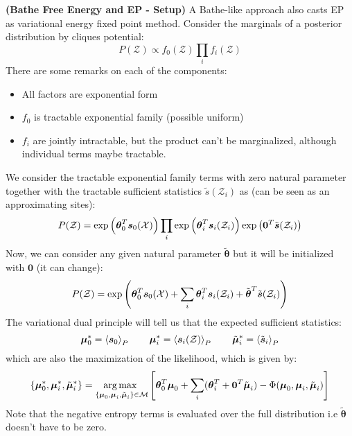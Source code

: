 \begin{remark}{\textbf{(Bathe Free Energy and EP - Setup)}}
    A Bathe-like approach also casts EP as variational energy fixed point method. Consider the marginals of a posterior distribution by cliques potential:
    \begin{equation*}
        P(\mathcal{Z}) \propto f_0(\mathcal{Z})\prod_i f_i(\mathcal{Z})
    \end{equation*}
    There are some remarks on each of the components:
    \begin{itemize}
        \item All factors are exponential form
        \item $f_0$ is tractable exponential family (possible uniform)
        \item $f_i$ are jointly intractable, but the product can't be marginalized, although individual terms maybe tractable. 
    \end{itemize}
    We consider the tractable exponential family terms with zero natural parameter together with the tractable sufficient statistics $\tilde{s}(\mathcal{Z}_i)$ as (can be seen as an approximating sites):
    \begin{equation*}
        P(\mathcal{Z}) = \exp\left( \boldsymbol \theta^T_0\boldsymbol s_0(\mathcal{X}) \right)\prod_i\exp\left( \boldsymbol \theta_i^T\boldsymbol s_i(\mathcal{Z}_i) \right)\exp\left( \boldsymbol 0^T\tilde{\boldsymbol s}(\mathcal{Z}_i) \right)
    \end{equation*}
    Now, we can consider any given natural parameter $\tilde{\boldsymbol \theta}$ but it will be initialized with $\boldsymbol 0$ (it can change):
    \begin{equation*}
        P(\mathcal{Z}) = \exp\left( \boldsymbol \theta^T_0\boldsymbol s_0(\mathcal{X}) + \sum_i \boldsymbol \theta_i^T\boldsymbol s_i(\mathcal{Z}_i) + \tilde{\boldsymbol \theta}^T\tilde{\boldsymbol s}(\mathcal{Z}_i) \right)
    \end{equation*}
    The variational dual principle will tell us that the expected sufficient statistics:
    \begin{equation*}
        \boldsymbol \mu^*_0 = \left\langle \boldsymbol s_0 \right\rangle_P \qquad \boldsymbol \mu^*_i = \left\langle \boldsymbol s_i(\mathcal{Z}) \right\rangle_P  \qquad \tilde{\boldsymbol \mu}_i^* = \left\langle \tilde{\boldsymbol s}_i \right\rangle_P
    \end{equation*}
    which are also the maximization of the likelihood, which is given by:
    \begin{equation*}
        \left\{ \boldsymbol \mu^*_0, \boldsymbol \mu^*_i, \tilde{\boldsymbol \mu}_i^* \right\} = \underset{\left\{ \boldsymbol \mu_0, \boldsymbol \mu_i, \tilde{\boldsymbol \mu}_i \right\} \in \mathcal{M}}{\arg\max \ } \left[ \boldsymbol \theta^T_0\boldsymbol \mu_0 + \sum_i(\boldsymbol \theta^T_i + \boldsymbol 0^T\tilde{\boldsymbol \mu}_i) - \Phi(\boldsymbol \mu_0, \boldsymbol \mu_i, \tilde{\boldsymbol \mu}_i) \right]
    \end{equation*}
    Note that the negative entropy terms is evaluated over the full distribution i.e $\tilde{\boldsymbol \theta}$ doesn't have to be zero.
\end{remark}

